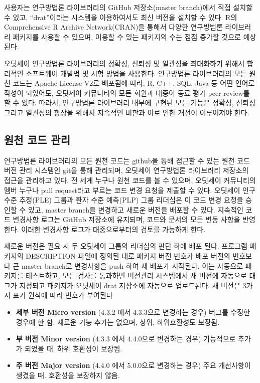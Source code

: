 \documentclass[10.5pt]{book}
\providecommand{\tightlist}{%
  \setlength{\itemsep}{0pt}\setlength{\parskip}{0pt}}
\theoremstyle{definition}
\theoremstyle{definition}
\theoremstyle{definition}
\theoremstyle{remark}
\begin{document}
사용자는 연구방법론 라이브러리의 GitHub 저장소(master branch)에서 직접
설치할 수 있고, ``drat''이라는 시스템을 이용하여서도 최신 버전을 설치할
수 있다. R의 Comprehensive R Archive Network(CRAN)을 통해서 다양한
연구방법론 라이브러리 패키지를 사용할 수 있으며, 이용할 수 있는 패키지의
수는 점점 증가할 것으로 예상된다.

오딧세이 연구방법론 라이브러리의 정확성, 신뢰성 및 일관성을 최대화하기
위해서 합리적인 소프트웨어 개발법 및 시험 방법을 사용한다. 연구방법론
라이브러리의 모든 원천 코드는 Apache License V2로 배포됨에 따라, R, C++,
SQL, Java 등 어떤 언어로 작성이 되었어도, 오딧세이 커뮤니티의 모든
회원과 대중이 동료 평가 peer review를 할 수 있다. 따라서, 연구방법론
라이브러리 내부에 구현된 모든 기능은 정확성, 신뢰성 그리고 일관성의
향상을 위해서 지속적인 비판과 이로 인한 개선이 이루어져야 한다.

\subsection{원천 코드 관리}\label{--}

연구방법론 라이브러리의 모든 원천 코드는 github을 통해 접근할 수 있는
원천 코드 버전 관리 시스템인 git을 통해 관리되며, 오딧세이 연구방법론
라이브러리 저장소의 접근을 관리하고 있다. 전 세계 누구나 원천 코드를 볼
수 있으며, 오딧세이 커뮤니티의 멤버 누구나 pull request라고 부르는 코드
변경 요청을 제출할 수 있다. 오딧세이 인구 수준 추정(PLE) 그룹과 환자
수준 예측(PLP) 그룹 리더십은 이 코드 변경 요청을 승인할 수 있고, master
branch을 변경하고 새로운 버전을 배포할 수 있다. 지속적인 코드 변경사항
로그는 GitHub 저장소에 유지되며, 코드와 문서의 모든 변동 사항을
반영한다. 이러한 변경사항 로그가 대중으로부터의 검토를 가능하게 한다.

새로운 버전은 필요 시 두 오딧세이 그룹의 리더십의 판단 하에 배포 된다.
프로그램 패키지의 DESCRIPTION 파일에 정의된 대로 패키지 버전 번호가 배포
버전의 번호보다 큰 master branch로 변경사항을 push 하여 새 배포가
시작된다. 이는 자동으로 패키지를 테스트하고, 모든 검사를 통과하면
버전관리 시스템에서 새 버전에 자동으로 태그가 지정되고 패키지가 오딧세이
drat 저장소에 자동으로 업로드된다. 새 버전은 3가지 표기 원칙에 따라
번호가 부여된다

\begin{itemize}
\tightlist
\item
  \textbf{세부 버전 Micro version} (4.3.2 에서 4.3.3으로 변경하는 경우)
  버그를 수정한 경우에 한 함. 새로운 기능 추가는 없으며, 상위,
  하위호환성도 보장됨.
\item
  \textbf{부 버전 Minor version} (4.3.3 에서 4.4.0으로 변경하는 경우)
  기능적으로 추가가 되었을 때. 하위 호환성이 보장됨.
\item
  \textbf{주 버전 Major version} (4.4.0 에서 5.0.0으로 변경하는 경우)
  주요 개선사항이 생겼을 때. 호환성을 보장하지 않음.
\end{itemize}
\end{document}
